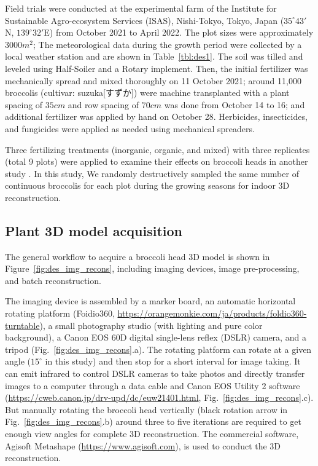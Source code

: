 Field trials were conducted at the experimental farm of the Institute for Sustainable Agro-ecosystem Services (ISAS), Nishi-Tokyo, Tokyo, Japan ($35^\circ 43'$N, $139^\circ 32'$E) from October 2021 to April 2022. The plot sizes were approximately $3000 m^2$; The meteorological data during the growth period were collected by a local weather station and are shown in Table~\ref{tbl:des1}. The soil was tilled and leveled using Half-Soiler and a Rotary implement. Then, the initial fertilizer was mechanically spread and mixed thoroughly on 11 October 2021; around 11,000 broccolis (cultivar: suzuka[すずか]) were machine transplanted with a plant spacing of $35 cm$ and row spacing of $70 cm$ was done from October 14 to 16; and additional fertilizer was applied by hand on October 28. Herbicides, insecticides, and fungicides were applied as needed using mechanical spreaders.



Three fertilizing treatments (inorganic, organic, and mixed) with three replicates (total 9 plots) were applied to examine their effects on broccoli heads in another study \citep{nishida_estimation_2023}. In this study, We randomly destructively sampled the same number of continuous broccolis for each plot during the growing seasons for indoor 3D reconstruction. 

\subsection{Plant 3D model acquisition}

The general workflow to acquire a broccoli head 3D model is shown in Figure~\ref{fig:des_img_recons}, including imaging devices, image pre-processing, and batch reconstruction.



The imaging device is assembled by a marker board, an automatic horizontal rotating platform (Foidio360, \url{https://orangemonkie.com/ja/products/foldio360-turntable}), a small photography studio (with lighting and pure color background), a Canon EOS 60D digital single-lens reflex (DSLR) camera, and a tripod (Fig.~\ref{fig:des_img_recons}.a). The rotating platform can rotate at a given angle ($15^\circ$ in this study) and then stop for a short interval for image taking. It can emit infrared to control DSLR cameras to take photos and directly transfer images to a computer through a data cable and Canon EOS Utility 2 software (\url{https://cweb.canon.jp/drv-upd/dc/euw21401.html}, Fig.~\ref{fig:des_img_recons}.c). But manually rotating the broccoli head vertically (black rotation arrow in Fig.~\ref{fig:des_img_recons}.b) around three to five iterations are required to get enough view angles for complete 3D reconstruction. The commercial software, Agisoft Metashape (\url{https://www.agisoft.com}), is used to conduct the 3D reconstruction.

